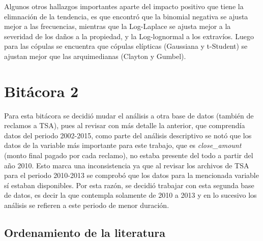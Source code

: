 \documentclass[
  letterpaper,
  onepage,
  openany]{scrreprt}
\begin{document}
Algunos otros hallazgos importantes aparte del impacto positivo que
tiene la elimnación de la tendencia, es que encontró que la binomial
negativa se ajusta mejor a las frecuencias, mientras que la Log-Laplace
se ajusta mejor a la severidad de los daños a la propiedad, y la
Log-lognormal a los extravíos. Luego para las cópulas se encuentra que
cópulas elípticas (Gaussiana y t-Student) se ajustan mejor que las
arquimedianas (Clayton y Gumbel).


\hypertarget{bituxe1cora-2}{%
\chapter{Bitácora 2}\label{bituxe1cora-2}}

Para esta bitácora se decidió mudar el análisis a otra base de datos
(también de reclamos a TSA), pues al revisar con más detalle la
anterior, que comprendía datos del periodo 2002-2015, como parte del
análisis descriptivo se notó que los datos de la variable más importante
para este trabajo, que es \emph{close\_amount} (monto final pagado por
cada reclamo), no estaba presente del todo a partir del año 2010. Esto
marca una inconsistencia ya que al revisar los archivos de TSA para el
periodo 2010-2013 se comprobó que los datos para la mencionada variable
sí estaban disponibles. Por esta razón, se decidió trabajar con esta
segunda base de datos, es decir la que contempla solamente de 2010 a
2013 y en lo sucesivo los análisis se refieren a este periodo de menor
duración.

\hypertarget{ordenamiento-de-la-literatura}{%
\section{Ordenamiento de la
literatura}\label{ordenamiento-de-la-literatura}}
\end{document}
